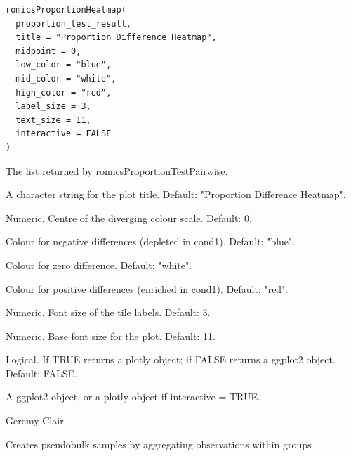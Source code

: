 \documentclass[a4paper]{book}
\begin{document}
%
\begin{Usage}
\begin{verbatim}
romicsProportionHeatmap(
  proportion_test_result,
  title = "Proportion Difference Heatmap",
  midpoint = 0,
  low_color = "blue",
  mid_color = "white",
  high_color = "red",
  label_size = 3,
  text_size = 11,
  interactive = FALSE
)
\end{verbatim}
\end{Usage}
%
\begin{Arguments}
\begin{ldescription}
\item[\code{proportion\_test\_result}] The list returned by romicsProportionTestPairwise.

\item[\code{title}] A character string for the plot title. Default:
"Proportion Difference Heatmap".

\item[\code{midpoint}] Numeric. Centre of the diverging colour scale. Default: 0.

\item[\code{low\_color}] Colour for negative differences (depleted in cond1).
Default: "blue".

\item[\code{mid\_color}] Colour for zero difference. Default: "white".

\item[\code{high\_color}] Colour for positive differences (enriched in cond1).
Default: "red".

\item[\code{label\_size}] Numeric. Font size of the tile labels. Default: 3.

\item[\code{text\_size}] Numeric. Base font size for the plot. Default: 11.

\item[\code{interactive}] Logical. If TRUE returns a plotly object; if FALSE
returns a ggplot2 object. Default: FALSE.
\end{ldescription}
\end{Arguments}
%
\begin{Value}
A ggplot2 object, or a plotly object if interactive = TRUE.
\end{Value}
%
\begin{Author}
Geremy Clair
\end{Author}
%
\begin{Description}
Creates pseudobulk samples by aggregating observations within groups
\end{Description}
\end{document}
